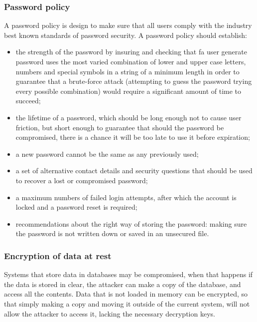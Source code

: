 \subsubsection{Password policy}
A password policy is design to make sure that all users comply with the industry
best known standards of password security. A password policy should
establish:
\begin{itemize}
  \item the strength of the password by insuring and checking that fa user
  generate password uses the most varied combination of lower and upper case
  letters, numbers and special symbols in a string of a minimum length in order
  to guarantee that a brute-force attack (attempting to guess the password
  trying every possible combination) would require a significant amount of time
  to succeed;
  \item the lifetime of a password, which should be long enough not to cause
  user friction, but short enough to guarantee that should the password be
  compromised, there is a chance it will be too late to use it before
  expiration;
  \item a new password cannot be the same as any previously used;
  \item a set of alternative contact details and security questions that should
  be used to recover a lost or compromised password;
  \item a maximum numbers of failed login attempts, after which the account is
  locked and a password reset is required;
  \item recommendations about the right way of storing the password: making sure
  the password is not written down or saved in an unsecured file.
\end{itemize}

\subsubsection{Encryption of data at rest}
Systems that store data in databases may be compromised, when that happens if
the data is stored in clear, the attacker can make a copy of the database, and
access all the contents. Data that is not loaded in memory can be encrypted, so
that simply making a copy and moving it outside of the current system, will not
allow the attacker to access it, lacking the necessary decryption keys.

